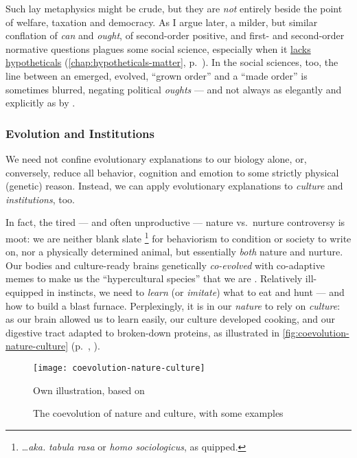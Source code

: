 Such lay metaphysics might be crude, but they are \emph{not} entirely beside the point of welfare, taxation and democracy.
As I argue later, a milder, but similar conflation of \emph{can} and \emph{ought}, of second-order positive, and first- and second-order normative questions plagues some social science, especially when it \hyperref[chap:hypotheticals-matter]{lacks hypotheticals} (\autoref{chap:hypotheticals-matter}, p.~\pageref{chap:hypotheticals-matter}).
In the social sciences, too, the line between an emerged, evolved, ``grown order'' and a ``made order'' is sometimes blurred, negating political \emph{oughts} --- and not always as elegantly and explicitly as by \cite[37]{Hayek1973}.

\subsubsection{Evolution and Institutions}
We need not confine evolutionary explanations to our biology alone, or, conversely, reduce all behavior, cognition and emotion to some strictly physical (genetic) reason.
Instead, we can apply evolutionary explanations to \emph{culture} and \emph{institutions}, too.

In fact, the tired --- and often unproductive --- nature vs.\ nurture controversy is moot:
we are neither blank slate
\footnote{
	\ldots \emph{aka.} \emph{tabula rasa} or \emph{homo sociologicus}, as \cite{Dahrendorf1965} quipped.
}
for behaviorism to condition or society to write on, nor a physically determined animal, but essentially \emph{both} nature and nurture.
Our bodies and culture-ready brains genetically \emph{co-evolved} with co-adaptive memes \citep{Dawkins1976} to make us the ``hypercultural species'' that we are \citep[K175]{Henrich2007}.
Relatively ill-equipped in instincts, we need to \emph{learn} (or \emph{imitate}) what to eat and hunt --- and how to build a blast furnace.
Perplexingly, it is in our \emph{nature} to rely on \emph{culture}:
as our brain allowed us to learn easily, our culture developed cooking, and our digestive tract adapted to broken-down proteins, as illustrated in \autoref{fig:coevolution-nature-culture} (p.~\pageref{fig:coevolution-nature-culture}, \citealt[confer][]{Henrich2007}).

\begin{figure}[htbp]
	\begin{center}
	\texttt{[image: coevolution-nature-culture]}
	\caption[Coevolution of Nature and Culture]{The coevolution of nature and culture, with some examples}
	\end{center}
	\scriptsize{Own illustration, based on \citet[K120ff]{Henrich2007}}
	\label{fig:coevolution-nature-culture}
\end{figure}

